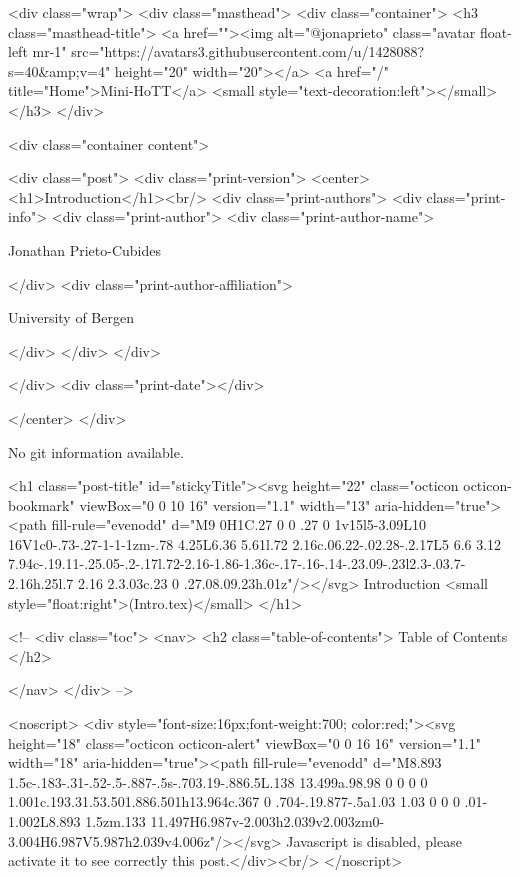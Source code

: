     <div class="wrap">
      <div class="masthead">
        <div class="container">
          <h3 class="masthead-title">
            <a href=""><img alt="@jonaprieto" class="avatar float-left mr-1" src="https://avatars3.githubusercontent.com/u/1428088?s=40&amp;v=4" height="20" width="20"></a>
            <a href="/" title="Home">Mini-HoTT</a>
            <small style="text-decoration:left"></small>
          </h3>
        </div>
      
      <div class="container content">
        







<div class="post">
  <div class="print-version">
    <center>
      <h1>Introduction</h1><br/>
        <div class="print-authors">
          <div class="print-info">
            <div class="print-author">
              <div class="print-author-name">
                
                  Jonathan Prieto-Cubides
                
              </div>
              <div class="print-author-affiliation">
                
                  University of Bergen
                
                </div>
            </div>
          </div>
          
          
        </div>
        <div class="print-date"></div>
        
        
    </center>
  </div>

  
  No git information available.
  

  <h1 class="post-title" id="stickyTitle"><svg height="22" class="octicon octicon-bookmark" viewBox="0 0 10 16" version="1.1" width="13" aria-hidden="true"><path fill-rule="evenodd" d="M9 0H1C.27 0 0 .27 0 1v15l5-3.09L10 16V1c0-.73-.27-1-1-1zm-.78 4.25L6.36 5.61l.72 2.16c.06.22-.02.28-.2.17L5 6.6 3.12 7.94c-.19.11-.25.05-.2-.17l.72-2.16-1.86-1.36c-.17-.16-.14-.23.09-.23l2.3-.03.7-2.16h.25l.7 2.16 2.3.03c.23 0 .27.08.09.23h.01z"/></svg> Introduction <small style="float:right">(Intro.tex)</small>
  </h1>

  <!-- 
  <div class="toc">
    <nav>
    <h2 class="table-of-contents"> Table of Contents </h2>
      

    </nav>
  </div>
   -->

  <noscript>
  <div style="font-size:16px;font-weight:700; color:red;"><svg height="18" class="octicon octicon-alert" viewBox="0 0 16 16" version="1.1" width="18" aria-hidden="true"><path fill-rule="evenodd" d="M8.893 1.5c-.183-.31-.52-.5-.887-.5s-.703.19-.886.5L.138 13.499a.98.98 0 0 0 0 1.001c.193.31.53.501.886.501h13.964c.367 0 .704-.19.877-.5a1.03 1.03 0 0 0 .01-1.002L8.893 1.5zm.133 11.497H6.987v-2.003h2.039v2.003zm0-3.004H6.987V5.987h2.039v4.006z"/></svg> Javascript is disabled, please activate it to see correctly this post.</div><br/>
  </noscript>

